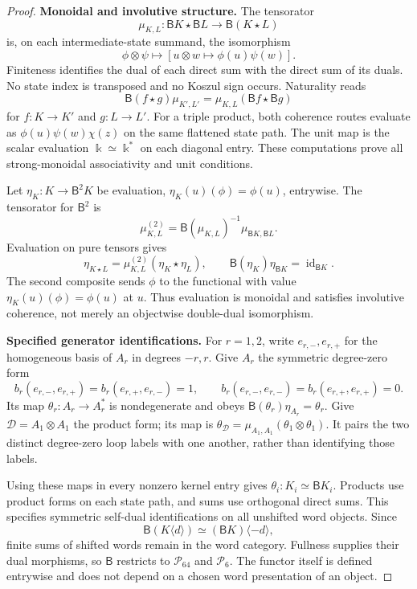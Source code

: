 \documentclass[11pt,a4paper]{article}
\theoremstyle{named}\newtheorem{finding}{Finding}[section]
\theoremstyle{definition}\newtheorem{definition}[finding]{Definition}
\theoremstyle{remark}\newtheorem{remark}[finding]{Remark}
\begin{document}
\begin{proof}
\par\smallskip\noindent\textbf{Monoidal and involutive structure.}\quad
The tensorator
\[
 \mu_{K,L}:\mathsf B K\star\mathsf B L
                 \longrightarrow\mathsf B(K\star L)
\]
is, on each intermediate-state summand, the isomorphism
\[
 \phi\otimes\psi\longmapsto
 [u\otimes w\longmapsto\phi(u)\psi(w)].
\]
Finiteness identifies the dual of each direct sum with the
direct sum of its duals. No state index is transposed and no
Koszul sign occurs. Naturality reads
\[
 \mathsf B(f\star g)\mu_{K',L'}
       =\mu_{K,L}(\mathsf Bf\star\mathsf Bg)
\]
for $f:K\to K'$ and $g:L\to L'$.
For a triple product, both coherence routes evaluate as
$\phi(u)\psi(w)\chi(z)$ on the same flattened state path.
The unit map is the scalar evaluation $\Bbbk\simeq\Bbbk^*$
on each diagonal entry. These computations prove all
strong-monoidal associativity and unit conditions.

Let $\eta_K:K\to\mathsf B^2K$ be evaluation,
$\eta_K(u)(\phi)=\phi(u)$, entrywise. The tensorator for
$\mathsf B^2$ is
\[
 \mu^{(2)}_{K,L}
 =\mathsf B(\mu_{K,L})^{-1}
       \mu_{\mathsf B K,\mathsf B L}.
\]
Evaluation on pure tensors gives
\[
 \eta_{K\star L}=\mu^{(2)}_{K,L}(\eta_K\star\eta_L),
 \qquad
 \mathsf B(\eta_K)\eta_{\mathsf B K}
        =\operatorname{id}_{\mathsf B K}.
\]
The second composite sends $\phi$ to the functional with
value $\eta_K(u)(\phi)=\phi(u)$ at $u$.
Thus evaluation is monoidal and satisfies involutive
coherence, not merely an objectwise double-dual isomorphism.

\par\smallskip\noindent\textbf{Specified generator identifications.}\quad
For $r=1,2$, write $e_{r,-},e_{r,+}$ for the homogeneous
basis of $A_r$ in degrees $-r,r$. Give $A_r$ the symmetric
degree-zero form
\[
 b_r(e_{r,-},e_{r,+})=b_r(e_{r,+},e_{r,-})=1,
 \qquad b_r(e_{r,-},e_{r,-})=b_r(e_{r,+},e_{r,+})=0.
\]
Its map $\theta_r:A_r\to A_r^*$ is nondegenerate and obeys
$\mathsf B(\theta_r)\eta_{A_r}=\theta_r$.
Give $\mathcal D=A_1\otimes A_1$ the product form;
its map is $\theta_{\mathcal D}=\mu_{A_1,A_1}
(\theta_1\otimes\theta_1)$.
It pairs the two distinct degree-zero loop labels with
one another, rather than identifying those labels.

Using these maps in every nonzero kernel entry gives
$\theta_i:K_i\simeq\mathsf B K_i$.
Products use product forms on each state path, and sums
use orthogonal direct sums. This specifies symmetric
self-dual identifications on all unshifted word objects.
Since
\[
 \mathsf B(K\langle d\rangle)
     \simeq(\mathsf B K)\langle-d\rangle,
\]
finite sums of shifted words remain in the word category.
Fullness supplies their dual morphisms, so $\mathsf B$
restricts to $\mathcal P_{64}$ and $\mathcal P_6$.
The functor itself is defined entrywise and does not
depend on a chosen word presentation of an object.


\end{proof}
\end{document}
